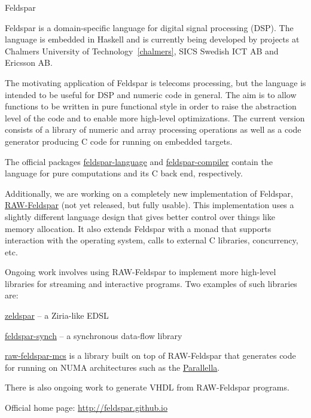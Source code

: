 \begin{hcarentry}[updated]{Feldspar}
\label{feldspar}
\makeheader

Feldspar is a domain-specific language for digital signal processing (DSP). The
language is embedded in Haskell and is currently being developed by projects at
Chalmers University of Technology~\cref{chalmers}, SICS Swedish ICT AB and
Ericsson AB.

The motivating application of Feldspar is telecoms processing, but the language
is intended to be useful for DSP and numeric code in general. The aim is to
allow functions to be written in pure functional style in order to raise the
abstraction level of the code and to enable more high-level optimizations. The
current version consists of a library of numeric and array processing operations
as well as a code generator producing C code for running on embedded targets.

The official packages
\href{http://hackage.haskell.org/package/feldspar-language}{feldspar-language}
and
\href{http://hackage.haskell.org/package/feldspar-compiler}{feldspar-compiler}
contain the language for pure computations and its C back end, respectively.

Additionally, we are working on a completely new implementation of Feldspar,
\href{https://github.com/emilaxelsson/raw-feldspar}{RAW-Feldspar} (not yet
released, but fully usable). This implementation uses a slightly different
language design that gives better control over things like memory allocation. It
also extends Feldspar with a monad that supports interaction with the operating
system, calls to external C libraries, concurrency, etc.

Ongoing work involves using RAW-Feldspar to implement more high-level libraries
for streaming and interactive programs. Two examples of such libraries are:

\begin{compactitem}
\item \href{https://github.com/koengit/zeldspar}{zeldspar} -- a Ziria-like EDSL
\item \href{https://github.com/emilaxelsson/feldspar-synch}{feldspar-synch} -- a synchronous data-flow library
\end{compactitem}

\href{https://github.com/kmate/raw-feldspar-mcs}{raw-feldspar-mcs} is a
library built on top of RAW-Feldspar that generates code for running on NUMA
architectures such as the \href{http://www.parallella.org}{Parallella}.

There is also ongoing work to generate VHDL from RAW-Feldspar programs.

\FurtherReading
\begin{compactitem}
\item Official home page: \url{http://feldspar.github.io}
\end{compactitem}
\end{hcarentry}
